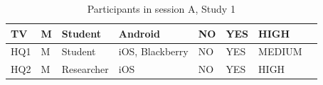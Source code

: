 \begin{table}[H]
{\begin{tabular}{|l|l|l|l|l|l|l|l|}
TV       & M      & Student    & Android                                                         & NO                                                                 & YES                                                                  & HIGH                                                         &                         \\ \hline
HQ1      & M      & Student    & iOS, Blackberry                                                 & NO                                                                 & YES                                                                  & MEDIUM                                                       &                         \\ \hline
HQ2      & M      & Researcher & iOS                                                             & NO                                                                 & YES                                                                  & HIGH                                                         &                         \\ \hline
\end{tabular}}
\caption{Participants in session A, Study 1}
\end{table}




